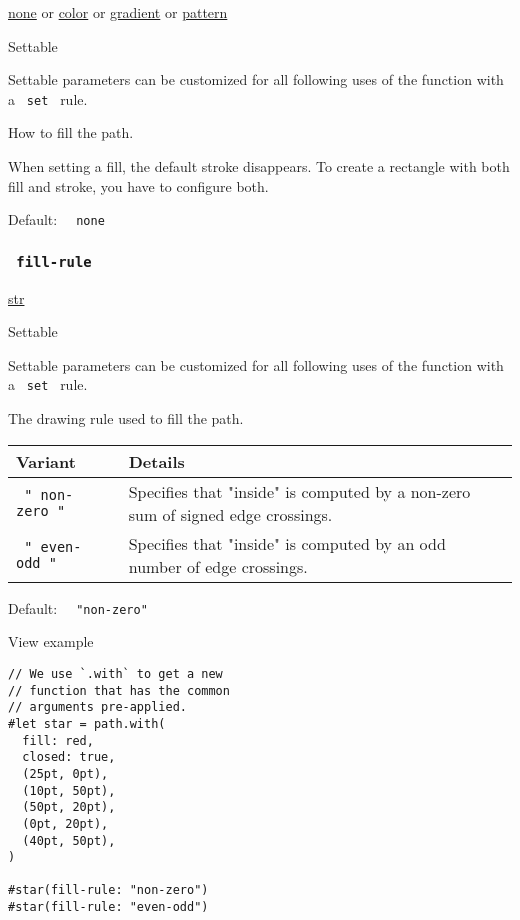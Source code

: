 \href{/docs/reference/foundations/none/}{none} {or}
\href{/docs/reference/visualize/color/}{color} {or}
\href{/docs/reference/visualize/gradient/}{gradient} {or}
\href{/docs/reference/visualize/pattern/}{pattern}

{{ Settable }}

\label{parameters-fill-settable-tooltip}
Settable parameters can be customized for all following uses of the
function with a \texttt{\ set\ } rule.

How to fill the path.

When setting a fill, the default stroke disappears. To create a
rectangle with both fill and stroke, you have to configure both.

Default: \texttt{\ }{\texttt{\ none\ }}\texttt{\ }

\subsubsection{\texorpdfstring{\texttt{\ fill-rule\ }}{ fill-rule }}\label{parameters-fill-rule}

\href{/docs/reference/foundations/str/}{str}

{{ Settable }}

\label{parameters-fill-rule-settable-tooltip}
Settable parameters can be customized for all following uses of the
function with a \texttt{\ set\ } rule.

The drawing rule used to fill the path.

\begin{longtable}[]{@{}ll@{}}
\toprule\noalign{}
Variant & Details \\
\midrule\noalign{}
\endhead
\bottomrule\noalign{}
\endlastfoot
\texttt{\ "\ non-zero\ "\ } & Specifies that "inside" is computed by a
non-zero sum of signed edge crossings. \\
\texttt{\ "\ even-odd\ "\ } & Specifies that "inside" is computed by an
odd number of edge crossings. \\
\end{longtable}

Default: \texttt{\ }{\texttt{\ "non-zero"\ }}\texttt{\ }


View example

\begin{verbatim}
// We use `.with` to get a new
// function that has the common
// arguments pre-applied.
#let star = path.with(
  fill: red,
  closed: true,
  (25pt, 0pt),
  (10pt, 50pt),
  (50pt, 20pt),
  (0pt, 20pt),
  (40pt, 50pt),
)

#star(fill-rule: "non-zero")
#star(fill-rule: "even-odd")
\end{verbatim}

